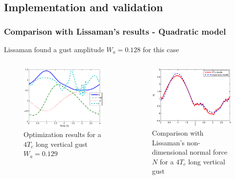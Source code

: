 \documentclass[compress]{beamer}
\begin{document}
\subsection{Implementation and validation}

\begin{frame}
  \frametitle{Comparison with Lissaman's results - Quadratic model}
  Lissaman found a gust amplitude $W_a=0.128$ for this case 
  \begin{columns}
    \begin{figure}[ht]
      \begin{center}	
	\includegraphics[width=1\textwidth]{./Figures/Windtype=1_Tg=4_Wg=0p129_quad_G=20.eps}
      \end{center}
      \caption{Optimization results for a $4T_c$ long vertical gust $W_a=0.129$}
    \end{figure}
    \begin{figure}[h]
      \centering
      \includegraphics[width=1\textwidth]{./Figures/LIssaman_N_comparison.eps}
      \caption{Comparison with Lissaman's non-dimensional normal force $N$ for a $4T_c$ long vertical gust}
    \end{figure}
  \end{columns}
\end{frame}
\end{document}
